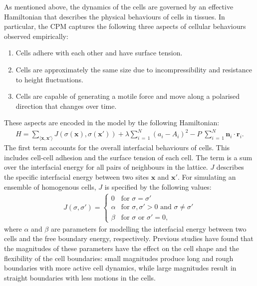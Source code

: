 \documentclass[a4paper,12pt]{article}
\begin{document}
As mentioned above, the dynamics of the cells are governed by an effective Hamiltonian that describes the physical behaviours of cells in tissues. In particular, the CPM captures the following three aspects of cellular behaviours observed empirically:
\begin{enumerate}
\item Cells adhere with each other and have surface tension.
\item Cells are approximately the same size due to incompressibility and resistance to height fluctuations.
\item Cells are capable of generating a motile force and move along a polarised direction that changes over time.
\end{enumerate}
These aspects are encoded in the model by the following Hamiltonian:
\begin{eqnarray}
\label{eqn:hamiltonian}
H = \sum_{\langle{\bm{x}, \bm{x'}\rangle}} J\left(\sigma(\bm{x}), \sigma(\bm{x'})\right) + \lambda \sum_{i\,=\,1}^{N} \left(a_i - A_i\right)^2 - P \;\sum_{i\,=\,1}^{N} \bm{n}_i \cdot \bm{r}_i.
\end{eqnarray}
The first term accounts for the overall interfacial behaviours of cells. This includes cell-cell adhesion and the surface tension of each cell. The term is a sum over the interfacial energy for all pairs of neighbours in the lattice. $J$ describes the specific interfacial energy between two sites $\bm{x}$ and $\bm{x}'$. For simulating an ensemble of homogenous cells, $J$ is specified by the following values:
\begin{eqnarray}
\label{eqn:interfacial_energy}
J(\sigma,\sigma') = \left\{
	\begin {array}{ll}
		0 & \textrm{for $\sigma = \sigma'$}\\
		\alpha & \textrm{for $\sigma, \sigma' > 0$ and $\sigma \neq \sigma'$}\\
		\beta & \textrm{for $\sigma$ or $\sigma' = 0$},
	\end{array}
\right.
\end{eqnarray}
where $\alpha$ and $\beta$ are parameters for modelling the interfacial energy between two cells and the free boundary energy, respectively. Previous studies have found that the magnitudes of these parameters have the effect on the cell shape and the flexibility of the cell boundaries: small magnitudes produce long and rough boundaries with more active cell dynamics, while large magnitudes result in straight boundaries with less motions in the cells\cite{szabo2010}.
\end{document}
